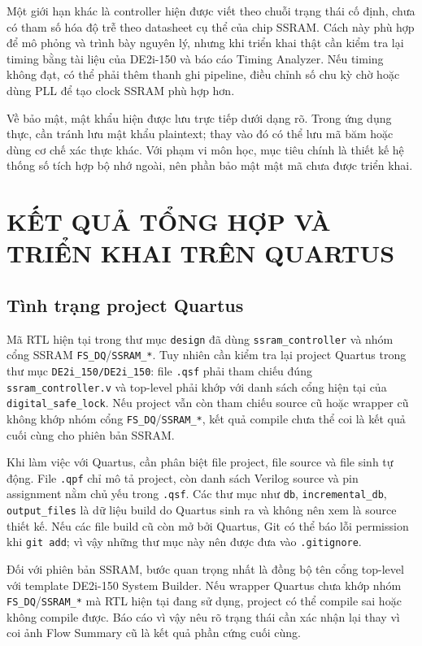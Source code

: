 \documentclass[13pt,a4paper]{article}
\begin{document}
Một giới hạn khác là controller hiện được viết theo chuỗi trạng thái cố định, chưa có tham số hóa độ trễ theo datasheet cụ thể của chip SSRAM. Cách này phù hợp để mô phỏng và trình bày nguyên lý, nhưng khi triển khai thật cần kiểm tra lại timing bằng tài liệu của DE2i-150 và báo cáo Timing Analyzer. Nếu timing không đạt, có thể phải thêm thanh ghi pipeline, điều chỉnh số chu kỳ chờ hoặc dùng PLL để tạo clock SSRAM phù hợp hơn.

Về bảo mật, mật khẩu hiện được lưu trực tiếp dưới dạng rõ. Trong ứng dụng thực, cần tránh lưu mật khẩu plaintext; thay vào đó có thể lưu mã băm hoặc dùng cơ chế xác thực khác. Với phạm vi môn học, mục tiêu chính là thiết kế hệ thống số tích hợp bộ nhớ ngoài, nên phần bảo mật mật mã chưa được triển khai.

\clearpage
\section{KẾT QUẢ TỔNG HỢP VÀ TRIỂN KHAI TRÊN QUARTUS}
\subsection{Tình trạng project Quartus}
Mã RTL hiện tại trong thư mục \texttt{design} đã dùng \texttt{ssram\_controller} và nhóm cổng SSRAM \texttt{FS\_DQ}/\texttt{SSRAM\_*}. Tuy nhiên cần kiểm tra lại project Quartus trong thư mục \texttt{DE2i\_150/DE2i\_150}: file \texttt{.qsf} phải tham chiếu đúng \texttt{ssram\_controller.v} và top-level phải khớp với danh sách cổng hiện tại của \texttt{digital\_safe\_lock}. Nếu project vẫn còn tham chiếu source cũ hoặc wrapper cũ không khớp nhóm cổng \texttt{FS\_DQ}/\texttt{SSRAM\_*}, kết quả compile chưa thể coi là kết quả cuối cùng cho phiên bản SSRAM.

Khi làm việc với Quartus, cần phân biệt file project, file source và file sinh tự động. File \texttt{.qpf} chỉ mô tả project, còn danh sách Verilog source và pin assignment nằm chủ yếu trong \texttt{.qsf}. Các thư mục như \texttt{db}, \texttt{incremental\_db}, \texttt{output\_files} là dữ liệu build do Quartus sinh ra và không nên xem là source thiết kế. Nếu các file build cũ còn mở bởi Quartus, Git có thể báo lỗi permission khi \texttt{git add}; vì vậy những thư mục này nên được đưa vào \texttt{.gitignore}.

Đối với phiên bản SSRAM, bước quan trọng nhất là đồng bộ tên cổng top-level với template DE2i-150 System Builder. Nếu wrapper Quartus chưa khớp nhóm \texttt{FS\_DQ}/\texttt{SSRAM\_*} mà RTL hiện tại đang sử dụng, project có thể compile sai hoặc không compile được. Báo cáo vì vậy nêu rõ trạng thái cần xác nhận lại thay vì coi ảnh Flow Summary cũ là kết quả phần cứng cuối cùng.
\end{document}
